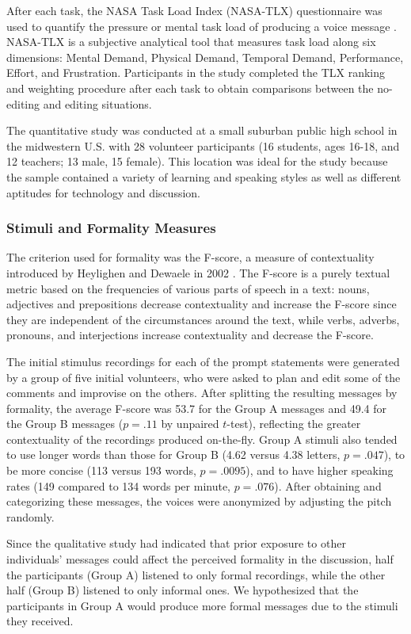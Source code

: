 After each task, the NASA Task Load Index (NASA-TLX) questionnaire was used to quantify the pressure or mental task load of producing a voice message \cite{nasatlx}. 
NASA-TLX is a subjective analytical tool that measures task load along six dimensions: Mental Demand, Physical Demand, Temporal Demand, Performance, Effort, and Frustration. 
Participants in the study completed the TLX ranking and weighting procedure after each task to obtain comparisons between the no-editing and editing situations.

The quantitative study was conducted at a small suburban public high school in the midwestern U.S. with 28 volunteer participants (16 students, ages 16-18, and 12 teachers; 13 male, 15 female).
This location was ideal for the study because the sample contained a variety of learning and speaking styles as well as different aptitudes for technology and discussion. 

\subsubsection{Stimuli and Formality Measures}\label{stimuli}
The criterion used for formality was the F-score, a measure of contextuality introduced by Heylighen and Dewaele in 2002 \cite{heylighen}.
The F-score is a purely textual metric based on the frequencies of various parts of speech in a text: nouns, adjectives and prepositions decrease contextuality and increase the F-score since they are independent of the circumstances around the text, while verbs, adverbs, pronouns, and interjections increase contextuality and decrease the F-score. 

The initial stimulus recordings for each of the prompt statements were generated by a group of five initial volunteers, who were asked to plan and edit some of the comments and improvise on the others. 
After splitting the resulting messages by formality, the average F-score was 53.7 for the Group A messages and 49.4 for the Group B messages ($p=.11$ by unpaired $t$-test), reflecting the greater contextuality of the recordings produced on-the-fly.
Group A stimuli also tended to use longer words than those for Group B (4.62 versus 4.38 letters, $p=.047$), to be more concise (113 versus 193 words, $p=.0095$), and to have higher speaking rates (149 compared to 134 words per minute, $p=.076$).
After obtaining and categorizing these messages, the voices were anonymized by adjusting the pitch randomly.

Since the qualitative study had indicated that prior exposure to other individuals' messages could affect the perceived formality in the discussion, half the participants (Group A) listened to only formal recordings, while the other half (Group B) listened to only informal ones.
We hypothesized that the participants in Group A would produce more formal messages due to the stimuli they received.

